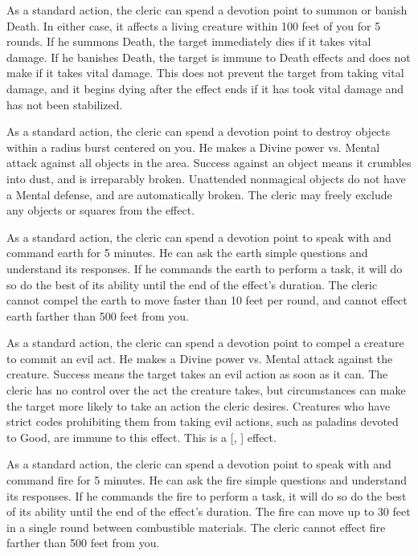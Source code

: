             As a standard action, the cleric can spend a devotion point to summon or banish Death.
            In either case, it affects a living creature within 100 feet of you for 5 rounds.
            If he summons Death, the target immediately dies if it takes vital damage.
            If he banishes Death, the target is immune to Death effects and does not make  if it takes vital damage.
            This does not prevent the target from taking vital damage, and it begins dying after the effect ends if it has took vital damage and has not been stabilized.

            As a standard action, the cleric can spend a devotion point to destroy objects within a \arealarge radius burst centered on you.
            He makes a Divine power vs. Mental attack against all objects in the area.
            Success against an object means it crumbles into dust, and is irreparably broken.
            Unattended nonmagical objects do not have a Mental defense, and are automatically broken.
            The cleric may freely exclude any objects or squares from the effect.

            As a standard action, the cleric can spend a devotion point to speak with and command earth for 5 minutes.
            He can ask the earth simple questions and understand its responses.
            If he commands the earth to perform a task, it will do so do the best of its ability until the end of the effect's duration.
            The cleric cannot compel the earth to move faster than 10 feet per round, and cannot effect earth farther than 500 feet from you.

            As a standard action, the cleric can spend a devotion point to compel a creature to commit an evil act.
            He makes a Divine power vs. Mental attack against the creature.
            Success means the target takes an evil action as soon as it can.
            The cleric has no control over the act the creature takes, but circumstances can make the target more likely to take an action the cleric desires.
            Creatures who have strict codes prohibiting them from taking evil actions, such as paladins devoted to Good, are immune to this effect.
            This is a [, ] effect.

            As a standard action, the cleric can spend a devotion point to speak with and command fire for 5 minutes.
            He can ask the fire simple questions and understand its responses.
            If he commands the fire to perform a task, it will do so do the best of its ability until the end of the effect's duration.
            The fire can move up to 30 feet in a single round between combustible materials.
            The cleric cannot effect fire farther than 500 feet from you.

